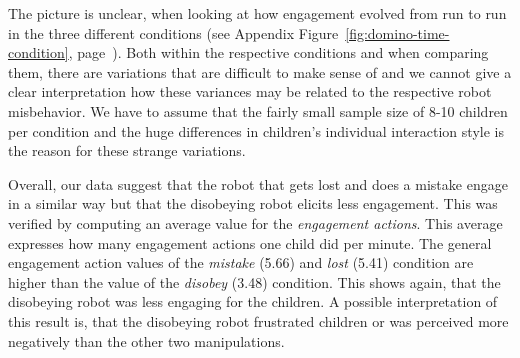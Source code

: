 \documentclass{sig-alternate}
\begin{document}

The picture is unclear, when looking at how engagement evolved from run to run
in the three different conditions (see Appendix
Figure~\ref{fig:domino-time-condition},
page~\pageref{fig:domino-time-condition}). Both within the respective conditions
and when comparing them, there are variations that are difficult to make sense
of and we cannot give a clear interpretation how these variances may be related
to the respective robot misbehavior. We have to assume that the fairly small
sample size of 8-10 children per condition and the huge differences in
children's individual interaction style is the reason for these strange
variations.

Overall, our data suggest that the robot that gets lost and does a mistake
engage in a similar way but that the disobeying robot elicits less engagement.
This was verified by computing an average value for the \textit{engagement
actions}. This average expresses how many engagement actions one child did per
minute. The general engagement action values of the \textit{mistake} (5.66) and
\textit{lost} (5.41) condition are higher than the value of the \textit{disobey}
(3.48) condition. This shows again, that the disobeying robot was less engaging
for the children. A possible interpretation of this result is, that the
disobeying robot frustrated children or was perceived more negatively than the
other two manipulations.
\end{document}
